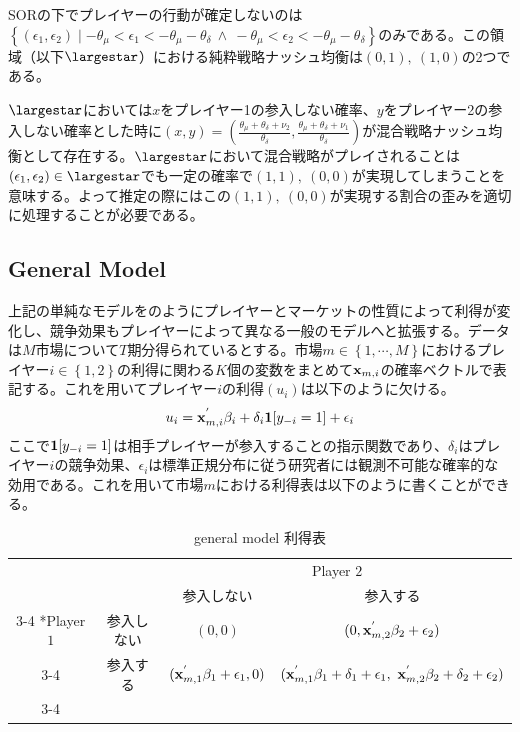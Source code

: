 \documentclass{jsarticle}
\begin{document}
SORの下でプレイヤーの行動が確定しないのは$\left\{ (\epsilon_1, \epsilon_2) \mid -\theta_{\mu} < \epsilon_1 < -\theta_{\mu} - \theta_{\delta}\ \wedge\  -\theta_{\mu} < \epsilon_2 < -\theta_{\mu} - \theta_{\delta} \right\}$のみである。この領域（以下$\largestar$）における純粋戦略ナッシュ均衡は$(0,1),\ (1,0)$の2つである。

$\largestar$においては$x$をプレイヤー1の参入しない確率、$y$をプレイヤー2の参入しない確率とした時に$(x, y) = \left( \frac{\theta_{\mu} + \theta_{\delta} + \nu_2}{\theta_{\delta}} ,  \frac{\theta_{\mu} + \theta_{\delta} + \nu_1}{\theta_{\delta}} \right)$が混合戦略ナッシュ均衡として存在する。$\largestar$において混合戦略がプレイされることは$(\epsilon_1, \epsilon_2) \in \largestar$でも一定の確率で$(1,1),\ (0,0)$が実現してしまうことを意味する。よって推定の際にはこの$(1,1),\ (0,0)$が実現する割合の歪みを適切に処理することが必要である。

\subsection{General Model}
上記の単純なモデルを\cite{Tamer2003a}のようにプレイヤーとマーケットの性質によって利得が変化し、競争効果もプレイヤーによって異なる一般のモデルへと拡張する。データは$M$市場について$T$期分得られているとする。市場$m \in \left\{ 1, \cdots, M\right\}$におけるプレイヤー$i \in \left\{ 1,2\right\}$の利得に関わる$K$個の変数をまとめて${\bf x}_{m, i}$の確率ベクトルで表記する。これを用いてプレイヤー$i$の利得$(u_i)$は以下のように欠ける。
\begin{align*}
	u_i = {\bf x}_{m, i}^{'} \beta_i + \delta_i {\bf 1}[y_{-i} = 1]+ \epsilon_i
\end{align*}
ここで${\bf 1}[y_{-i} = 1]$は相手プレイヤーが参入することの指示関数であり、$\delta_i$はプレイヤー$i$の競争効果、$\epsilon_i$は標準正規分布に従う研究者には観測不可能な確率的な効用である。これを用いて市場$m$における利得表は以下のように書くことができる。
\begin{table}[h]
    \caption{general model 利得表}
    \centering
    \setlength{\extrarowheight}{2pt}
    \begin{tabular}{cc|c|c|}
      & \multicolumn{1}{c}{} & \multicolumn{2}{c}{Player $2$}\\
      & \multicolumn{1}{c}{} & \multicolumn{1}{c}{参入しない}  & \multicolumn{1}{c}{参入する} \\\cline{3-4}
      \multirow{2}*{Player $1$}  & 参入しない & $(0,0)$ & $(0,{\bf x}_{m, 2}^{'} \beta_2+\epsilon_2)$ \\\cline{3-4}
      & 参入する & $({\bf x}_{m, 1}^{'} \beta_1+\epsilon_1,0)$ & $({\bf x}_{m, 1}^{'} \beta_1+\delta_1+\epsilon_1,\ {\bf x}_{m, 2}^{'} \beta_2+\delta_2+\epsilon_2)$ \\\cline{3-4}
    \end{tabular}
\end{table}
\end{document}
